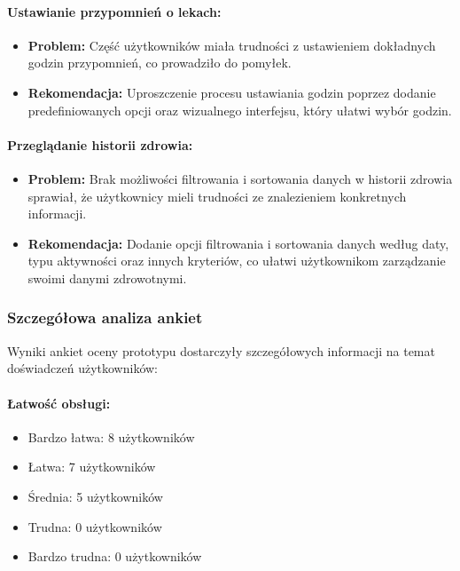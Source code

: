 \paragraph{Ustawianie przypomnień o lekach:}
\begin{itemize}
  \item \textbf{Problem:} Część użytkowników miała trudności z ustawieniem dokładnych godzin przypomnień, co prowadziło do pomyłek.
  \item \textbf{Rekomendacja:} Uproszczenie procesu ustawiania godzin poprzez dodanie predeﬁniowanych opcji oraz wizualnego interfejsu, który ułatwi wybór godzin.
\end{itemize}

\paragraph{Przeglądanie historii zdrowia:}
\begin{itemize}
  \item \textbf{Problem:} Brak możliwości ﬁltrowania i sortowania danych w historii zdrowia sprawiał, że użytkownicy mieli trudności ze znalezieniem konkretnych informacji.
  \item \textbf{Rekomendacja:} Dodanie opcji ﬁltrowania i sortowania danych według daty, typu aktywności oraz innych kryteriów, co ułatwi użytkownikom zarządzanie swoimi danymi zdrowotnymi.
\end{itemize}

\subsubsection{Szczegółowa analiza ankiet}

\quad Wyniki ankiet oceny prototypu dostarczyły szczegółowych informacji na temat doświadczeń użytkowników:

\paragraph{Łatwość obsługi:}
\begin{itemize}
  \item Bardzo łatwa: 8 użytkowników
  \item Łatwa: 7 użytkowników
  \item Średnia: 5 użytkowników
  \item Trudna: 0 użytkowników
  \item Bardzo trudna: 0 użytkowników
\end{itemize}

